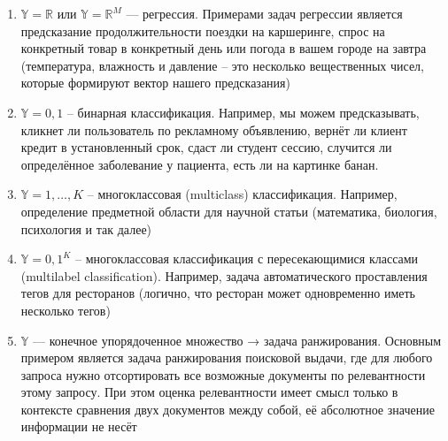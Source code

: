 \begin{enumerate}

    \item $\mathbb{Y} = \mathbb{R}$ или $\mathbb{Y} = \mathbb{R}^M$ — регрессия.
    Примерами задач регрессии является предсказание продолжительности поездки на каршеринге, спрос на конкретный
    товар в конкретный день или погода в вашем городе на завтра (температура, влажность и давление -- это
    несколько вещественных чисел, которые формируют вектор нашего предсказания)

    \item $\mathbb{Y} = 0,1$ -- бинарная классификация.
    Например, мы можем предсказывать, кликнет ли пользователь по рекламному объявлению, вернёт ли клиент кредит
    в установленный срок, сдаст ли студент сессию, случится ли определённое заболевание у пациента, есть ли на
    картинке банан.

    \item $\mathbb{Y} = 1,\dots,K$ -- многоклассовая (multiclass) классификация.
    Например, определение предметной области для научной статьи (математика, биология, психология и так далее)

    \item $\mathbb{Y} = 0,1^K$ -- многоклассовая классификация с пересекающимися классами (multilabel classification).
    Например, задача автоматического проставления тегов для ресторанов (логично, что ресторан может одновременно
    иметь несколько тегов)

    \item $\mathbb{Y}$ — конечное упорядоченное множество → задача ранжирования.
    Основным примером является задача ранжирования поисковой выдачи, где для любого запроса нужно отсортировать все
    возможные документы по релевантности этому запросу.
    При этом оценка релевантности имеет смысл только в контексте сравнения двух документов между собой, её
    абсолютное значение информации не несёт

\end{enumerate}